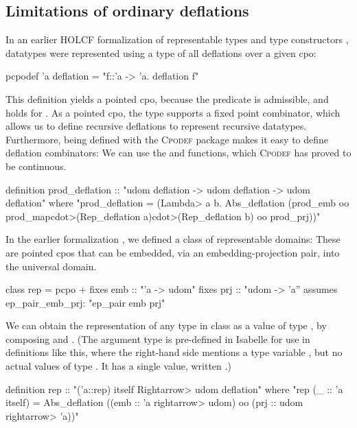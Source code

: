 \subsection{Limitations of ordinary deflations}
\label{sec:definitional-alg-limitations}

In an earlier HOLCF formalization of representable types and type constructors \cite{huffman05axiomatic}, datatypes were represented using a type of all deflations over a given cpo:
%
\begin{isacode}
pcpodef 'a deflation = "{f::'a -> 'a. deflation f}"
\end{isacode}
%
This definition yields a pointed cpo, because the  predicate is admissible, and holds for . As a pointed cpo, the  type supports a fixed point combinator, which allows us to define recursive deflations to represent recursive datatypes. Furthermore, being defined with the \textsc{Cpodef} package makes it easy to define deflation combinators: We can use the  and  functions, which \textsc{Cpodef} has proved to be continuous.

\begin{isacode}
definition prod_deflation ::
    "udom deflation -> udom deflation -> udom deflation"
  where "prod_deflation = (\<Lambda> a b. Abs_deflation
    (prod_emb oo prod_map\<cdot>(Rep_deflation a)\<cdot>(Rep_deflation b) oo prod_prj))"
\end{isacode}

In the earlier formalization \cite{huffman05axiomatic}, we defined a class  of representable domains: These are pointed cpos that can be embedded, via an embedding-projection pair, into the universal domain.

\begin{isacode}
class rep = pcpo +
  fixes emb :: "'a -> udom"
  fixes prj :: "udom -> 'a''
  assumes ep_pair_emb_prj: "ep_pair emb prj"
\end{isacode}
%
We can obtain the representation of any type in class  as a value of type , by composing  and . (The argument type  is pre-defined in Isabelle for use in definitions like this, where the right-hand side mentions a type variable , but no actual values of type . It has a single value, written .)
%
\begin{isacode}
definition rep :: "('a::rep) itself \<Rightarrow> udom deflation"
  where "rep (_ :: 'a itself) =
    Abs_deflation ((emb :: 'a \<rightarrow> udom) oo (prj :: udom \<rightarrow> 'a))"
\end{isacode}

